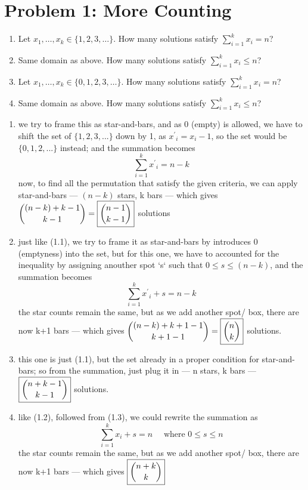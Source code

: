\newcommand{\hmwkTitle}{Homework 7}
\newcommand{\hmwkDueDate}{Tuesday, June 23, 2015}
\newcommand{\hmwkHeaderTitle}{ICCS206 Discrete Mathematic: Homework 7}


\section*{Problem 1: More Counting}
\begin{enumerate}[label=\arabic*.]
    \item Let $x_1,\dots,x_k \in \{1,2,3,\dots\}$. How many solutions satisfy $\sum_{i=1}^k x_i = n$?
    \item Same domain as above. How many solutions satisfy $\sum_{i=1}^k x_i \le n$?
    \item Let $x_1,\dots,x_k \in \{0,1,2,3,\dots\}$. How many solutions satisfy $\sum_{i=1}^k x_i = n$?
    \item Same domain as above. How many solutions satisfy $\sum_{i=1}^k x_i \le n$?
\end{enumerate}

\medskip
\solution

\begin{enumerate}
    \item we try to frame this as star-and-bars, and as 0 (empty) is allowed, we have to shift the set of $\{1, 2, 3, ...\}$ down by 1, as ${{x^'}_i} = x_i - 1$, so the set would be $\{0, 1, 2, ...\}$ instead; and the summation becomes 
        \[\sum_{i=1}^k {{x^'}_i} = n - k\]
        now, to find all the permutation that satisfy the given criteria, we can apply star-and-bars --- $(n-k)$ stars, k bars --- which gives $\dbinom{(n - k) + k - 1}{k-1} = \boxed{\dbinom{n-1}{k-1}}$ solutions
    \item just like (1.1), we try to frame it as star-and-bars by introduces 0 (emptyness) into the set, but for this one, we have to accounted for the inequality by assigning anouther spot `s` such that $0 \le s \le (n-k)$, and the summation becomes
        \[\sum_{i=1}^k {{x^'}_i} + s= n - k\]
        the star counts remain the same, but as we add another spot/ box, there are now k+1 bars --- which gives $\dbinom{(n - k) + k + 1 - 1}{k + 1 - 1}= \boxed{\dbinom{n}{k}}$ solutions.
    \item this one is just (1.1), but the set already in a proper condition for star-and-bars; so from the summation, just plug it in --- n stars, k bars --- $\boxed{\dbinom{n+k-1}{k-1}}$ solutions.
    \item like (1.2), followed from (1.3), we could rewrite the summation as
        \[\sum_{i=1}^k x_i + s = n \quad \text{ where } 0 \le s \le n\]
        the star counts remain the same, but as we add another spot/ box, there are now k+1 bars --- which gives $\boxed{\dbinom{n+k}{k}}$
\end{enumerate}

